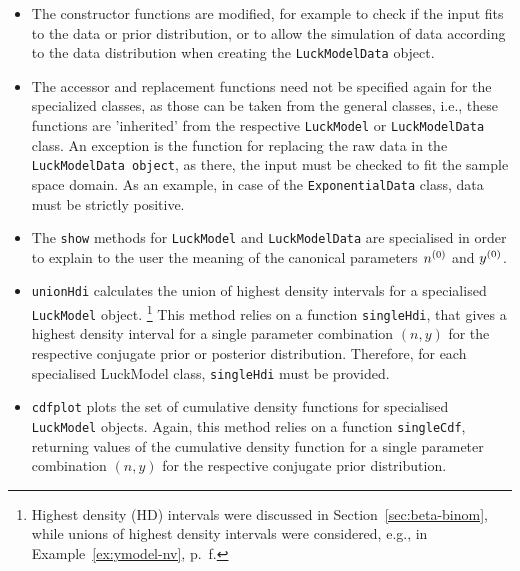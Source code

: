 \begin{itemize}
\item The constructor functions are modified, for example to check if the input
   fits to the data or prior distribution, or to allow the simulation of data
   according to the data distribution when creating the \texttt{LuckModelData} object.
\item The accessor and replacement functions need not be specified again for the
   specialized classes, as those can be taken from the general classes, i.e.,
   these functions are 'inherited' from the respective \texttt{LuckModel} or \texttt{LuckModelData}
   class. An exception is the function for replacing the raw data in the
   \texttt{LuckModelData object}, as there, the input must be checked to fit the sample
   space domain. As an example, in case of the \texttt{ExponentialData} class, data must be
   strictly positive.
\item The \texttt{show} methods for \texttt{LuckModel} and \texttt{LuckModelData} are specialised in order
   to explain to the user the meaning of the canonical parameters $n^{(0)}$ and $y^{(0)}$.
\item \texttt{unionHdi} calculates the union of highest density intervals for a
   specialised \texttt{LuckModel} object.%
   \footnote{Highest density (HD) intervals were discussed in Section~\ref{sec:beta-binom},
   while unions of highest density intervals were considered, e.g.,
   in Example~\ref{ex:ymodel-nv}, p.~\pageref{ex:ymodel-nv}f.}
   This method relies on a function \texttt{singleHdi},
   that gives a highest density interval for a single parameter combination
   $(n, y)$ for the respective conjugate prior or posterior distribution.
   Therefore, for each specialised LuckModel class, \texttt{singleHdi} must be
   provided.
\item \texttt{cdfplot} plots the set of cumulative density functions for specialised
   \texttt{LuckModel} objects. Again, this method relies on a function \texttt{singleCdf},
   returning values of the cumulative density function for a single parameter combination $(n, y)$
   for the respective conjugate prior distribution.
\end{itemize}













